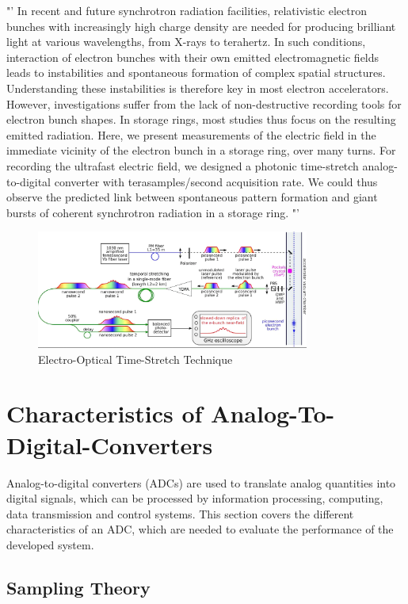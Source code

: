 "' In recent and future synchrotron radiation facilities, relativistic electron bunches with increasingly high charge density are needed for producing brilliant light at various wavelengths, from X-rays to terahertz. In such conditions, interaction of electron bunches with their own emitted electromagnetic fields leads to instabilities and spontaneous formation of complex spatial structures. Understanding these instabilities is therefore key in most electron accelerators. However, investigations suffer from the lack of non-destructive recording tools for electron bunch shapes. In storage rings, most studies thus focus on the resulting emitted radiation. Here, we present measurements of the electric field in the immediate vicinity of the electron bunch in a storage ring, over many turns. For recording the ultrafast electric field, we designed a photonic time-stretch analog-to-digital converter with terasamples/second acquisition rate. We could thus observe the predicted link between spontaneous pattern formation and giant bursts of coherent synchrotron radiation in a storage ring. "'  \cite{Bielawski2019}

\begin{figure}[H]
	\centering
	\includegraphics[width = 0.8\textwidth]{chap/02-theory/img/EO.png}
	\caption{Electro-Optical Time-Stretch Technique \cite{Bielawski2019}}
	\label{fig:eo}
\end{figure}


\newpage
\section{Characteristics of Analog-To-Digital-Converters}
Analog-to-digital converters (ADCs) are used to translate analog quantities into digital signals, which can be processed by information processing, computing, data transmission and control systems. This section covers the different characteristics of an ADC, which are needed to evaluate the performance of the developed system. 
\subsection{Sampling Theory}

